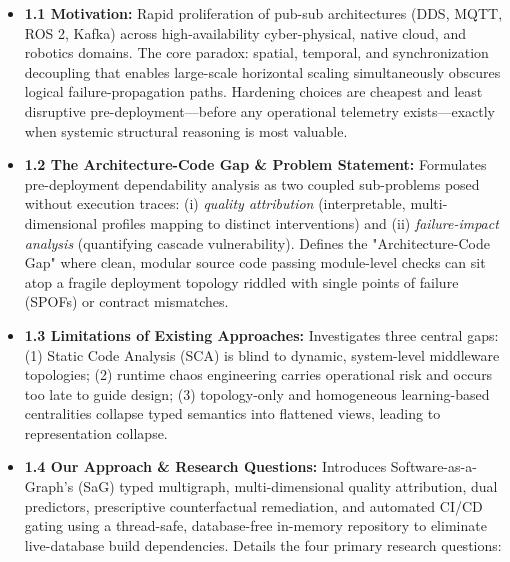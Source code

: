 \documentclass[review]{elsarticle}
\begin{document}
\begin{itemize}[leftmargin=*]
  \item \textbf{1.1 Motivation:} Rapid proliferation of pub-sub architectures (DDS, MQTT, ROS 2, Kafka) across high-availability cyber-physical, native cloud, and robotics domains. The core paradox: spatial, temporal, and synchronization decoupling that enables large-scale horizontal scaling simultaneously obscures logical failure-propagation paths. Hardening choices are cheapest and least disruptive pre-deployment—before any operational telemetry exists—exactly when systemic structural reasoning is most valuable.
  \item \textbf{1.2 The Architecture-Code Gap \& Problem Statement:} Formulates pre-deployment dependability analysis as two coupled sub-problems posed without execution traces: (i) \emph{quality attribution} (interpretable, multi-dimensional profiles mapping to distinct interventions) and (ii) \emph{failure-impact analysis} (quantifying cascade vulnerability). Defines the "Architecture-Code Gap" where clean, modular source code passing module-level checks can sit atop a fragile deployment topology riddled with single points of failure (SPOFs) or contract mismatches.
  \item \textbf{1.3 Limitations of Existing Approaches:} Investigates three central gaps: (1) Static Code Analysis (SCA) is blind to dynamic, system-level middleware topologies; (2) runtime chaos engineering carries operational risk and occurs too late to guide design; (3) topology-only and homogeneous learning-based centralities collapse typed semantics into flattened views, leading to representation collapse.
  \item \textbf{1.4 Our Approach \& Research Questions:} Introduces Software-as-a-Graph's (SaG) typed multigraph, multi-dimensional quality attribution, dual predictors, prescriptive counterfactual remediation, and automated CI/CD gating using a thread-safe, database-free in-memory repository to eliminate live-database build dependencies. Details the four primary research questions:
\end{itemize}
\end{document}
